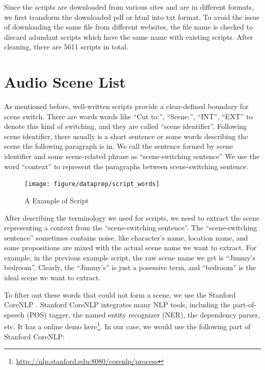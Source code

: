 Since the scripts are downloaded from various sites and are in different formats, we first transform the downloaded pdf or html into txt format. 
To avoid the issue of downloading the same file from different websites, the file name is checked to discard adundant scripts which have the same name with existing scripts. 
After cleaning, there are 5611 scripts in total. 

\section{Audio Scene List}
As mentioned before, well-written scripts provide a clear-defined boundary for scene switch. 
There are words words like ``Cut to:'', ``Scene:'', ``INT'', ``EXT'' to denote this kind of switching, and they are called ``scene identifier''.  
Following scene identifier, there usually is a short sentence or some words describing the scene the following paragraph is in. 
We call the sentence formed by scene identifier and some scene-related phrase as ``scene-switching sentence''
We use the word ``context'' to represent the paragraphs between scene-switching sentence. 

\begin{figure}[htb]
\centering
\hspace*{-0.5cm}
\texttt{[image: figure/dataprep/script\_words]}
\caption{A Example of Script}
\label{fig:script_words}
\end{figure}

After describing the terminology we used for scripts, we need to extract the scene representing a context from the ``scene-switching sentence''. 
The ``scene-switching sentence'' sometimes contains noise, like character's name, location name, and some propositions are mixed with the actual scene name we want to extract. 
For example, in the previous example script, the raw scene name we get is ``Jimmy's bedroom''. 
Clearly, the ``Jimmy's'' is just a posessive term, and ``bedroom'' is the ideal scene we want to extract. 

To filter out these words that could not form a scene, we use the Stanford CoreNLP \cite{manning2014corenlp}. 
Stanford CoreNLP integrates many NLP tools, including the part-of-speech (POS) tagger, the named entity recognizer (NER), the dependency parser, etc. 
It has a online demo here\footnote{\url{http://nlp.stanford.edu:8080/corenlp/process}}. 
In our case, we would use the following part of Stanford CoreNLP:
 
